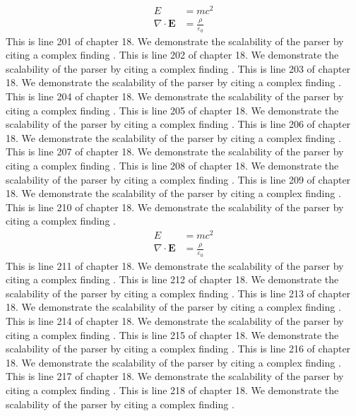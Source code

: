 \begin{align*}
  E &= mc^2 \\
  \nabla \cdot \mathbf{E} &= \frac{\rho}{\varepsilon_0}
\end{align*}
This is line 201 of chapter 18. We demonstrate the scalability of the parser by citing a complex finding \cite{ref18_201}.
This is line 202 of chapter 18. We demonstrate the scalability of the parser by citing a complex finding \cite{ref18_202}.
This is line 203 of chapter 18. We demonstrate the scalability of the parser by citing a complex finding \cite{ref18_203}.
This is line 204 of chapter 18. We demonstrate the scalability of the parser by citing a complex finding \cite{ref18_204}.
This is line 205 of chapter 18. We demonstrate the scalability of the parser by citing a complex finding \cite{ref18_205}.
This is line 206 of chapter 18. We demonstrate the scalability of the parser by citing a complex finding \cite{ref18_206}.
This is line 207 of chapter 18. We demonstrate the scalability of the parser by citing a complex finding \cite{ref18_207}.
This is line 208 of chapter 18. We demonstrate the scalability of the parser by citing a complex finding \cite{ref18_208}.
This is line 209 of chapter 18. We demonstrate the scalability of the parser by citing a complex finding \cite{ref18_209}.
This is line 210 of chapter 18. We demonstrate the scalability of the parser by citing a complex finding \cite{ref18_210}.
\begin{align*}
  E &= mc^2 \\
  \nabla \cdot \mathbf{E} &= \frac{\rho}{\varepsilon_0}
\end{align*}
This is line 211 of chapter 18. We demonstrate the scalability of the parser by citing a complex finding \cite{ref18_211}.
This is line 212 of chapter 18. We demonstrate the scalability of the parser by citing a complex finding \cite{ref18_212}.
This is line 213 of chapter 18. We demonstrate the scalability of the parser by citing a complex finding \cite{ref18_213}.
This is line 214 of chapter 18. We demonstrate the scalability of the parser by citing a complex finding \cite{ref18_214}.
This is line 215 of chapter 18. We demonstrate the scalability of the parser by citing a complex finding \cite{ref18_215}.
This is line 216 of chapter 18. We demonstrate the scalability of the parser by citing a complex finding \cite{ref18_216}.
This is line 217 of chapter 18. We demonstrate the scalability of the parser by citing a complex finding \cite{ref18_217}.
This is line 218 of chapter 18. We demonstrate the scalability of the parser by citing a complex finding \cite{ref18_218}.
